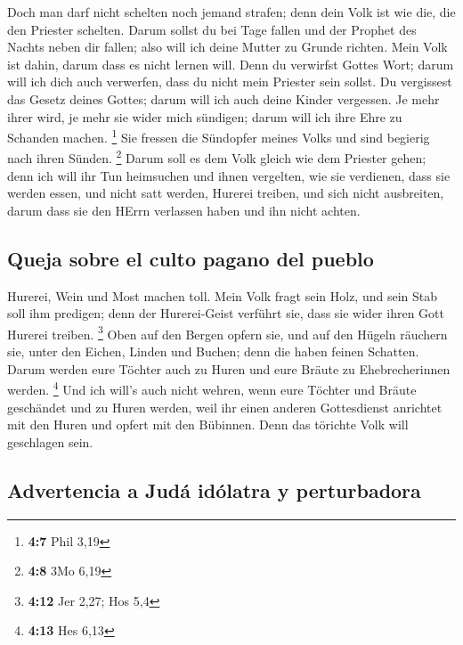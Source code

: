  Doch man darf nicht schelten noch jemand strafen; denn
dein Volk ist wie die, die den Priester schelten.  Darum
sollst du bei Tage fallen und der Prophet des Nachts neben dir fallen;
also will ich deine Mutter zu Grunde richten.  Mein Volk
ist dahin, darum dass es nicht lernen will. Denn du verwirfst Gottes
Wort; darum will ich dich auch verwerfen, dass du nicht mein Priester
sein sollst. Du vergissest das Gesetz deines Gottes; darum will ich auch
deine Kinder vergessen.  Je mehr ihrer wird, je mehr sie
wider mich sündigen; darum will ich ihre Ehre zu Schanden machen.
\footnote{\textbf{4:7} Phil 3,19}  Sie fressen die
Sündopfer meines Volks und sind begierig nach ihren Sünden. \footnote{\textbf{4:8}
  3Mo 6,19}  Darum soll es dem Volk gleich wie dem
Priester gehen; denn ich will ihr Tun heimsuchen und ihnen vergelten,
wie sie verdienen,  dass sie werden essen, und nicht satt
werden, Hurerei treiben, und sich nicht ausbreiten, darum dass sie den
HErrn verlassen haben und ihn nicht achten.

\hypertarget{queja-sobre-el-culto-pagano-del-pueblo}{%
\subsection{Queja sobre el culto pagano del
pueblo}\label{queja-sobre-el-culto-pagano-del-pueblo}}

 Hurerei, Wein und Most machen toll.  Mein
Volk fragt sein Holz, und sein Stab soll ihm predigen; denn der
Hurerei-Geist verführt sie, dass sie wider ihren Gott Hurerei treiben.
\footnote{\textbf{4:12} Jer 2,27; Hos 5,4}  Oben auf den
Bergen opfern sie, und auf den Hügeln räuchern sie, unter den Eichen,
Linden und Buchen; denn die haben feinen Schatten. Darum werden eure
Töchter auch zu Huren und eure Bräute zu Ehebrecherinnen werden.
\footnote{\textbf{4:13} Hes 6,13}  Und ich will's auch
nicht wehren, wenn eure Töchter und Bräute geschändet und zu Huren
werden, weil ihr einen anderen Gottesdienst anrichtet mit den Huren und
opfert mit den Bübinnen. Denn das törichte Volk will geschlagen sein.

\hypertarget{advertencia-a-juduxe1-iduxf3latra-y-perturbadora}{%
\subsection{Advertencia a Judá idólatra y
perturbadora}\label{advertencia-a-juduxe1-iduxf3latra-y-perturbadora}}

